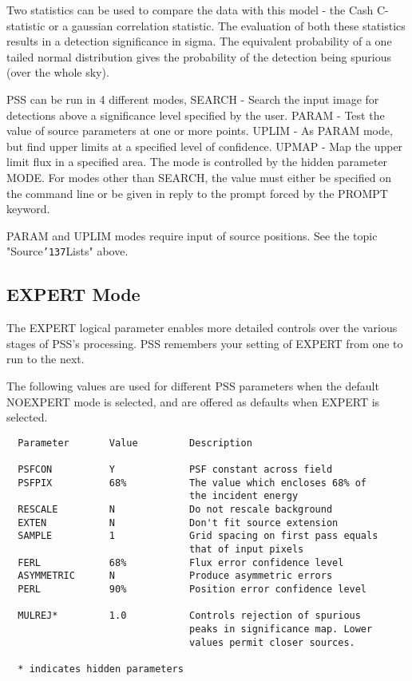 \documentclass{book}
\renewcommand{\_}{{\tt\char'137}}     %
\begin{document}
Two statistics can be used to compare the data with this model - the
Cash C-statistic or a gaussian correlation statistic. The evaluation
of both these statistics results in a detection significance in sigma.
The equivalent probability of a one tailed normal distribution gives
the probability of the detection being spurious (over the whole sky).
 
PSS can be run in 4 different modes,
SEARCH - Search the input image for detections above a significance
level specified by the user.
PARAM - Test the value of source parameters at one or more points.
UPLIM - As PARAM mode, but find upper limits at a specified level
of confidence.
UPMAP - Map the upper limit flux in a specified area.
The mode is controlled by the hidden parameter MODE. For modes other
than SEARCH, the value must either be specified on the command line
or be given in reply to the prompt forced by the PROMPT keyword.
 
PARAM and UPLIM modes require input of source positions. See the
topic "Source\_Lists" above.
 
\subsection{EXPERT Mode}
The EXPERT logical parameter enables more detailed controls over
the various stages of PSS's processing. PSS remembers your setting
of EXPERT from one to run to the next.
 
The following values are used for different PSS parameters when
the default NOEXPERT mode is selected, and are offered as defaults
when EXPERT is selected.
 
\begin{verbatim}
  Parameter       Value         Description
 
  PSFCON          Y             PSF constant across field
  PSFPIX          68%           The value which encloses 68% of
                                the incident energy
  RESCALE         N             Do not rescale background
  EXTEN           N             Don't fit source extension
  SAMPLE          1             Grid spacing on first pass equals
                                that of input pixels
  FERL            68%           Flux error confidence level
  ASYMMETRIC      N             Produce asymmetric errors
  PERL            90%           Position error confidence level
 
  MULREJ*         1.0           Controls rejection of spurious
                                peaks in significance map. Lower
                                values permit closer sources.
 
  * indicates hidden parameters
\end{verbatim}
\end{document}

